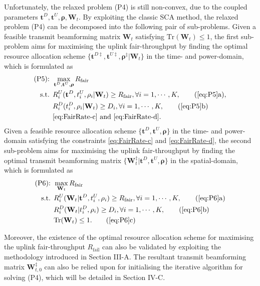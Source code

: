 \documentclass[12pt,draft,onecolumn,journal]{IEEEtran}
\begin{document}
Unfortunately, the relaxed problem (P4) is still non-convex, due to the coupled parameters ${\mathbf{t}^D, \mathbf{t}^U, \boldsymbol{\rho}, \mathbf{W}_t}$. By exploiting the classic SCA method, the relaxed problem (P4) can be decomposed into the following pair of sub-problems. Given a feasible transmit beamforming matrix $\mathbf{W}_t$ satisfying $\text{Tr}(\mathbf{W}_t)\leq 1$, the first sub-problem aims for maximising the uplink fair-throughput by finding the optimal resource allocation scheme $\{\mathbf{t}^{D\ddagger}, \mathbf{t}^{U\ddagger}, \boldsymbol{\rho}^{\ddagger} | \mathbf{W}_t\}$ in the time- and power-domain, which is formulated as
\begin{align}
	\text{(P5): } & \max_{\mathbf{t}^D, \mathbf{t}^U, \boldsymbol{\rho}} R_{\text{fair}} \label{eq:P5} \\
	\text{s.t. } & R_i^U(\mathbf{t}^D,t_i^U,\rho_i | \mathbf{W}_t) \geq R_{\text{fair}}, \forall i = 1,\cdots,K, \tag{\ref{eq:P5}a}, \label{eq:P5-a}\\
	& R_i^D(t_i^D,\rho_i | \mathbf{W}_t) \geq D_i, \forall i=1,\cdots,K, \tag{\ref{eq:P5}b} \label{eq:P5-b} \\
	& \text{\eqref{eq:FairRate-c} and \eqref{eq:FairRate-d}}.
\end{align}
Given a feasible resource allocation scheme $\{\mathbf{t}^{D}, \mathbf{t}^{U}, \boldsymbol{\rho}\}$ in the time- and power-domain satisfying the constraints \eqref{eq:FairRate-c} and \eqref{eq:FairRate-d}, the second sub-problem aims for maximising the uplink fair-throughput by finding the optimal transmit beamforming matrix $\{\mathbf{W}_t^{\ddagger} | \mathbf{t}^{D}, \mathbf{t}^{U}, \boldsymbol{\rho}\}$ in the spatial-domain, which is formulated as
\begin{align}
	\text{(P6): } & \max_{\mathbf{W}_t} R_{\text{fair}} \label{eq:P6} \\
	\text{s.t. } & R_i^U(\mathbf{W}_t | \mathbf{t}^D,t_i^U,\rho_i) \geq R_{\text{fair}}, \forall i = 1,\cdots,K, \tag{\ref{eq:P6}a} \label{eq:P6-a}\\
	& R_i^D(\mathbf{W}_t | t_i^D,\rho_i) \geq D_i, \forall i=1,\cdots,K, \tag{\ref{eq:P6}b} \label{eq:P6-b} \\
	&\text{Tr}(\mathbf{W}_t) \leq 1. \tag{\ref{eq:P6}c} \label{eq:P6-c}
\end{align}

Moreover, the existence of the optimal resource allocation scheme for maximising the uplink fair-throughput $R_{\text{fail}}$ can also be validated by exploiting the methodology introduced in Section III-A. The resultant transmit beamforming matrix $\mathbf{W}_{t,0}^{\ddagger}$ can also be relied upon for initialising the iterative algorithm for solving (P4), which will be detailed in Section IV-C. 
\end{document}
